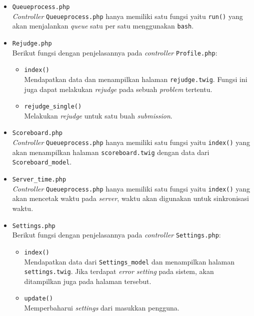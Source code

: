\begin{itemize}
      \item \verb|Queueprocess.php| \\
            \textit{Controller} \verb|Queueprocess.php| hanya memiliki satu fungsi yaitu \verb|run()| yang akan menjalankan \textit{queue} satu per satu menggunakan \verb|bash|.

      \item \verb|Rejudge.php| \\
            Berikut fungsi dengan penjelasannya pada \textit{controller} \verb|Profile.php|:

            \begin{itemize}
                  \item \verb|index()| \\
                        Mendapatkan data dan menampilkan halaman \verb|rejudge.twig|. Fungsi ini juga dapat melakukan \textit{rejudge} pada sebuah \textit{problem} tertentu.
                  \item \verb|rejudge_single()| \\
                        Melakukan \textit{rejudge} untuk satu buah \textit{submission}.
            \end{itemize}

      \item \verb|Scoreboard.php| \\
            \textit{Controller} \verb|Queueprocess.php| hanya memiliki satu fungsi yaitu \verb|index()| yang akan menampilkan halaman \verb|scoreboard.twig| dengan data dari \verb|Scoreboard_model|.

      \item \verb|Server_time.php| \\
            \textit{Controller} \verb|Queueprocess.php| hanya memiliki satu fungsi yaitu \verb|index()| yang akan mencetak waktu pada \textit{server}, waktu akan digunakan untuk sinkronisasi waktu.

      \item \verb|Settings.php| \\
            Berikut fungsi dengan penjelasannya pada \textit{controller} \verb|Settings.php|:

            \begin{itemize}
                  \item \verb|index()| \\
                        Mendapatkan data dari \verb|Settings_model| dan menampilkan halaman \verb|settings.twig|. Jika terdapat \textit{error setting} pada sistem, akan ditampilkan juga pada halaman tersebut.
                  \item \verb|update()| \\
                        Memperbaharui \textit{settings} dari masukkan pengguna.
            \end{itemize}


\end{itemize}

